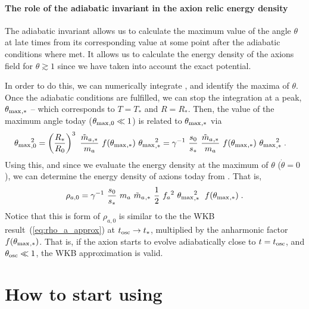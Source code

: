 \documentclass[11pt,a4paper]{article}
\begin{document}
\paragraph{The role of the adiabatic invariant in the axion relic energy density}
%
The adiabatic invariant allows us to calculate the maximum value of the angle $\theta$ at late times from its corresponding value at some point after the adiabatic conditions where met. It allows us to calculate the energy density of the axions field for $\theta \gtrsim 1$ since we have taken into account the exact potential.

In order to do this, we can numerically integrate , and identify the maxima of $\theta$. Once the adiabatic conditions are fulfilled, we can stop the integration at a peak, $\theta_{\rm max}{}_{,*}$ -- which corresponds to $T=T_{*}$ and $R=R_{*}$. Then, the value of the maximum angle today ($\theta_{\rm max}{}_{,0} \ll 1$) is related to $\theta_{\rm max}{}_{,*}$ via
%
\begin{eqnarray}
	\thetamax_{,0}^2 &=  \lrb{\dfrac{R_*}{R_0}}^3 \ \dfrac{\maT_{,*}}{\ma} \ f(\thetamax_{,*}) \ \thetamax_{,*}^2  =
	\gamma^{-1} \ \dfrac{s_0}{s_*} \ \dfrac{\maT_{,*}}{\ma} \ f(\thetamax_{,*}) \ \thetamax_{,*}^2 
	\; .
	\label{eq:theta_relation}
\end{eqnarray}
%
Using this, and since we evaluate the energy density at the maximum of $\theta$ (\ie $\dot \theta = 0$), we can determine the energy density of axions today from . That is,
%
\begin{equation}
	\rho_{a,0} = \gamma^{-1} \ \dfrac{s_0}{s_*} \ \ma \ \maT_{,*} \ \dfrac{1}{2} \ \fa^2 \ \thetamax_{,*}^2 \;  \ f(\thetamax_{,*}) \;.
	\label{eq:rho_axion_exact}
\end{equation}
%
Notice that this is form of $\rho_{a,0}$  is similar to the the WKB result~(\ref{eq:rho_a_approx}) at $t_{\rm osc}{} \to t_*$, multiplied by the anharmonic factor $f(\theta_{\rm max}{}_{,*})$. That is, if the axion starts to evolve adiabatically close to $t=t_{\rm osc}{}$, and $\theta_{\rm osc}{} \ll 1$, the WKB approximation is valid.






\section{How to start using \mimes}\label{sec:start}
\setcounter{equation}{0}
\end{document}
